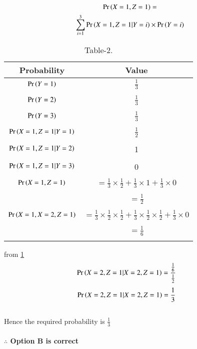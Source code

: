 \documentclass[journal,12pt,twocolumn]{IEEEtran}
\begin{document}
\begin{multline}
    \Pr\left(X=1,Z=1\right)=\\
    \sum_{i=1}^{3}\Pr\left(X=1,Z=1|Y=i\right)
    \times \Pr\left(Y=i\right)
\end{multline}
\newpage
\begin{table}[h!]
\resizebox{7cm}{!}
{
    \begin{tabular}{|c|c|}
         \hline
         Probability & Value\\
         \hline
         $\Pr\left(Y=1\right)$ & $\frac{1}{3}$\\&\\
         \hline
         $\Pr\left(Y=2\right)$ & $\frac{1}{3}$\\&\\
         \hline
         $\Pr\left(Y=3\right)$ & $\frac{1}{3}$\\&\\
         \hline
         $\Pr\left(X=1,Z=1|Y=1\right)$ & $\frac{1}{2}$ \\&\\
         \hline
         $\Pr\left(X=1,Z=1|Y=2\right)$ & 1\\&\\
         \hline
         $\Pr\left(X=1,Z=1|Y=3\right)$  & 0 \\&\\
         \hline
         $\Pr\left(X=1,Z=1\right)$ & $=\frac{1}{3}\times \frac{1}{2}+\frac{1}{3}\times 1+\frac{1}{3} \times 0$\\&\\ &$=\frac{1}{2}$\\&\\
         \hline
         $\Pr\left(X=1,X=2,Z=1\right)$ & $=\frac{1}{3}\times \frac{1}{2}\times \frac{1}{2}+\frac{1}{3}\times \frac{1}{2}\times \frac{1}{2}+\frac{1}{3}\times 0$\\&\\&$=\frac{1}{6}$\\&\\
         \hline
    \end{tabular}
    }
    \caption{\label{tab:Table-2}Table-2.}
\end{table}
from \ref{tab:Table-2} 
\begin{align}
\Pr\left(X=2,Z=1|X=2,Z=1\right)&=\frac{\frac{1}{6}}{\frac{1}{2}}
\end{align}
\begin{align}
\Pr\left(X=2,Z=1|X=2,Z=1\right)&=\frac{1}{3}
\end{align}
\\Hence the required probability is $\frac{1}{3}$\\
 \\ \textbf{$\therefore$ Option B is correct}
\end{document}
